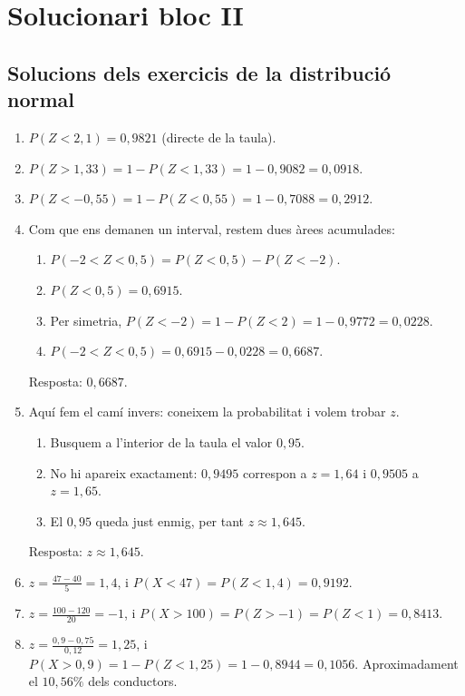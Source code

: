 \section{Solucionari bloc II}
\subsection{Solucions dels exercicis de la distribució normal}
\begin{enumerate}
 \item $P(Z<2{,}1)=0{,}9821$ (directe de la taula).

 \item $P(Z>1{,}33)=1-P(Z<1{,}33)=1-0{,}9082=0{,}0918$.

 \item $P(Z<-0{,}55)=1-P(Z<0{,}55)=1-0{,}7088=0{,}2912$.

 \item Com que ens demanen un interval, restem dues àrees acumulades:
 \begin{enumerate}[(1)]
  \item $P(-2<Z<0{,}5)=P(Z<0{,}5)-P(Z<-2)$.
  \item $P(Z<0{,}5)=0{,}6915$.
  \item Per simetria, $P(Z<-2)=1-P(Z<2)=1-0{,}9772=0{,}0228$.
  \item $P(-2<Z<0{,}5)=0{,}6915-0{,}0228=0{,}6687$.
 \end{enumerate}
 Resposta: $0{,}6687$.

 \item Aquí fem el camí invers: coneixem la probabilitat i volem trobar $z$.
 \begin{enumerate}[(1)]
  \item Busquem a l'interior de la taula el valor $0{,}95$.
  \item No hi apareix exactament: $0{,}9495$ correspon a $z=1{,}64$ i $0{,}9505$ a $z=1{,}65$.
  \item El $0{,}95$ queda just enmig, per tant $z\approx1{,}645$.
 \end{enumerate}
 Resposta: $z\approx1{,}645$.

 \item $z=\frac{47-40}{5}=1{,}4$, i $P(X<47)=P(Z<1{,}4)=0{,}9192$.

 \item $z=\frac{100-120}{20}=-1$, i $P(X>100)=P(Z>-1)=P(Z<1)=0{,}8413$.

 \item $z=\frac{0{,}9-0{,}75}{0{,}12}=1{,}25$, i $P(X>0{,}9)=1-P(Z<1{,}25)=1-0{,}8944=0{,}1056$. Aproximadament el $10{,}56\%$ dels conductors.


\end{enumerate}
